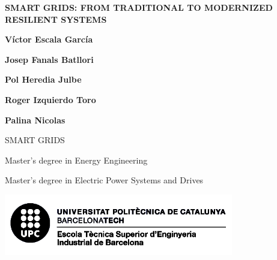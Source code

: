 \documentclass[10pt, a4paper]{report}
\begin{document}
\begin{titlepage}
   \begin{center}
      \vspace*{2em}
      {\Large \bfseries SMART GRIDS: FROM TRADITIONAL TO MODERNIZED RESILIENT SYSTEMS}

       \vspace{6em}

       \textbf{Víctor Escala García}

       \textbf{Josep Fanals Batllori}

       \textbf{Pol Heredia Julbe}

       \textbf{Roger Izquierdo Toro}

       \textbf{Palina Nicolas}

       \vfill

       \vspace{1em}

       SMART GRIDS

       Master's degree in Energy Engineering

       Master's degree in Electric Power Systems and Drives

       \vspace{8em}
     
       \includegraphics[width=10cm]{Data/Logo.png}
            
   \end{center}
\end{titlepage}


\begin{abstract}
   This report presents the methodology applied to improve the performance of a transmission network affected by several difficulties. The main purposes of the study have been the increase in the security of supply and the design of a more resilient electrical system to decrease the dependence on interconnection points to external transport networks. Several contingency analyses have been run to achieve these final goals. The project has been divided into four different phases. In the 1st phase, a study of the current system has been performed, leading to the development of the 2nd phase, which has added several transmission lines to improve the security of supply between generation and demand. The 3rd phase has consisted of the addition of two new renewable energy power plants to the electrical system, while the 4th phase has considered the installation of a storage unit and the restoration of a dismantled gas plant. Finally, a Smart Grid Architecture Model (SGAM) has been elaborated to close the project. By simulating several configurations of the transmission network, this study has reached the optimal structure of the system in economic and performance terms. With the new configuration, a more resilient, secure and environmentally friendly electrical system has been achieved, which completely matches the main objectives of smart grids.
\end{abstract}
\end{document}
